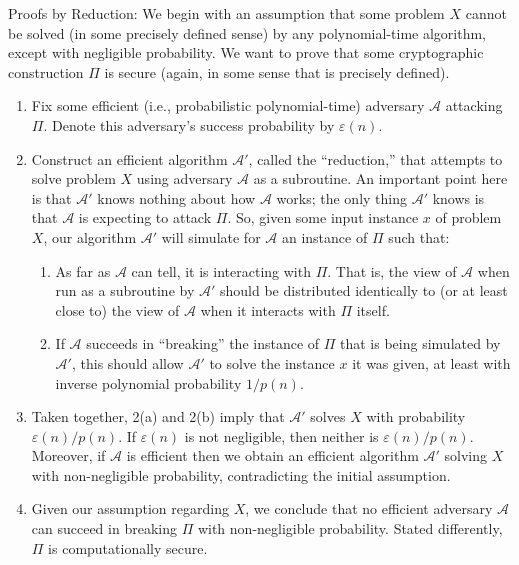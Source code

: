Proofs by Reduction: We begin with an assumption that some problem $X$
 cannot be solved (in some precisely defined sense) by any polynomial-time
  algorithm, except with negligible probability. We want to prove that some
   cryptographic construction $\Pi$ is secure (again, in some sense that is 
   precisely defined).
   \begin{enumerate}
       \item Fix some efficient (i.e., probabilistic polynomial-time)
        adversary $\mathcal{A}$ attacking $\Pi$. Denote this adversary’s
         success probability by $\varepsilon(n)$.
       \item Construct an efficient algorithm $\mathcal{A}'$, called the “reduction,” 
       that attempts to solve problem $X$ using adversary $\mathcal{A}$ as a 
       subroutine. An important point here is that $\mathcal{A}'$ knows nothing
        about how $\mathcal{A}$ works; the only thing $\mathcal{A}'$ knows 
        is that $\mathcal{A}$ is expecting to attack $\Pi$. So, given some input
         instance $x$ of problem $X$, our algorithm $\mathcal{A}'$ will simulate
          for $\mathcal{A}$ an instance of $\Pi$ such that:
          \begin{enumerate}
              \item As far as $\mathcal{A}$ can tell, it is interacting with 
              $\Pi$. That is, the view of $\mathcal{A}$ when run as a subroutine
               by $\mathcal{A}'$ should be distributed identically to 
               (or at least close to) the view of $\mathcal{A}$ when it
                interacts with $\Pi$ itself.
              \item If $\mathcal{A}$ succeeds in “breaking” the instance of 
              $\Pi$ that is being simulated by $\mathcal{A}'$, this should 
              allow $\mathcal{A}'$ to solve the instance $x$ it was given, 
              at least with inverse polynomial probability $1/p(n)$.
          \end{enumerate}
        \item Taken together, 2(a) and 2(b) imply that $\mathcal{A}'$ solves $X$
         with probability $\varepsilon(n)/p(n)$. If $\varepsilon(n)$ is not 
         negligible, then neither is $\varepsilon(n)/p(n)$. Moreover, 
         if $\mathcal{A}$ is efficient then we obtain an efficient algorithm 
         $\mathcal{A}'$ solving $X$ with non-negligible probability, 
         contradicting the initial assumption.
        \item Given our assumption regarding $X$, we conclude that no efficient 
        adversary $\mathcal{A}$ can succeed in breaking $\Pi$ with 
        non-negligible probability. Stated differently, 
        $\Pi$ is computationally secure.
   \end{enumerate}
